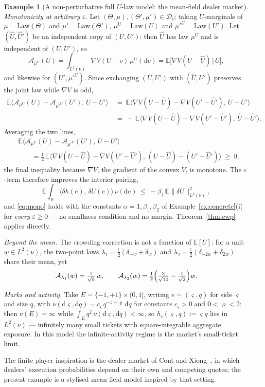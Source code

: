 \documentclass[preprint,12pt]{elsarticle}
\newcommand{\E}{\mathbb{E}}
\newcommand{\diff}{\mathrm{d}}
\newcommand{\inner}[2]{\langle #1,\,#2\rangle}
\newcommand{\Lnu}{L^2(\nu)}
\newcommand{\Law}{\mathrm{Law}}
\newcommand{\Lnorm}[1]{\lVert #1\rVert_{\Lnu}}
\numberwithin{equation}{section}
\theoremstyle{plain}
\theoremstyle{definition}
\theoremstyle{\PaperRemarkStyle}
\newtheorem{example}[theorem]{Example}
\begin{document}
\begin{example}[A non-perturbative full $U$-law model: the mean-field dealer market]
\smallskip
\emph{Monotonicity at arbitrary $\varepsilon$.} Let
$(\Theta,\mu),(\Theta',\mu')\in\mathcal D_t$; taking $U$-marginals of $\mu=\Law(\Theta)$
and $\mu'=\Law(\Theta')$, $\mu^U=\Law(U)$ and $\mu'^U=\Law(U')$. Let
$(\widehat U,\widehat U')$ be an independent copy of $(U,U')$: then $\widehat U$ has law
$\mu^U$ and is independent of $(U,U')$, so
\[
\mathcal A_{\mu^U}(U)=\int_{\Lnu}\nabla V(U-v)\,\mu^U(\diff v)
=\E\bigl[\nabla V(U-\widehat U)\,\big|\,U\bigr],
\]
and likewise for $(U',\mu'^U)$. Since
exchanging $(U,U')$ with $(\widehat U,\widehat U')$ preserves the joint law while
$\nabla V$ is odd,
\[
\begin{aligned}
\E\inner{\mathcal A_{\mu^U}(U)-\mathcal A_{\mu'^U}(U')}{U-U'}
&\ =\ \E\inner{\nabla V(U-\widehat U)-\nabla V(U'-\widehat U')}{U-U'}\\
&\ =\ -\,\E\inner{\nabla V(U-\widehat U)-\nabla V(U'-\widehat U')}{\widehat U-\widehat U'} .
\end{aligned}
\]
Averaging the two lines,
\[
\begin{aligned}
&\E\inner{\mathcal A_{\mu^U}(U)-\mathcal A_{\mu'^U}(U')}{U-U'}\\
&\qquad=\tfrac12\,\E\inner{\nabla V(U-\widehat U)-\nabla V(U'-\widehat U')}
{(U-\widehat U)-(U'-\widehat U')}\ \ge\ 0,
\end{aligned}
\]
the final inequality because $\nabla V$, the gradient of the convex $V$, is monotone.
The $\varepsilon$-term therefore improves the interior pairing,
\[
\E\int_E\inner{\delta h(e)}{\delta U(e)}\,\nu(\diff e)\ \le\ -\beta_1\,\E\Lnorm{\delta U}^2 ,
\]
and \eqref{eq:mono} holds with the constants $\alpha=1,\beta_1,\beta_2$ of
Example~\ref{ex:concrete}(i) for \emph{every} $\varepsilon\ge0$ --- no smallness
condition and no margin. Theorem~\ref{thm:cwp} applies directly.

\smallskip
\emph{Beyond the mean.} The crowding correction is not a function of $\E[U]$: for a
unit $w\in\Lnu$, the two-point laws $\lambda_1=\tfrac12(\delta_{-w}+\delta_{w})$ and
$\lambda_2=\tfrac12(\delta_{-2w}+\delta_{2w})$ share their mean, yet
\[
\mathcal A_{\lambda_1}(w)=\tfrac{1}{\sqrt5}\,w,\qquad
\mathcal A_{\lambda_2}(w)=\tfrac12\Bigl(\tfrac{3}{\sqrt{10}}-\tfrac1{\sqrt2}\Bigr)w .
\]

\smallskip
\emph{Marks and activity.} Take $E=\{-1,+1\}\times(0,1]$, writing $e=(\varsigma,q)$ for
side $\varsigma$ and size $q$, with
$\nu(\diff\varsigma,\diff q)=c_\varsigma\,q^{-1-\varrho}\,\diff q$ for constants
$c_\varsigma>0$ and $0<\varrho<2$: then $\nu(E)=\infty$ while
$\int_E q^2\,\nu(\diff\varsigma,\diff q)<\infty$, so $h_c(\varsigma,q):=\varsigma q$ lies
in $\Lnu$ --- infinitely many small tickets with square-integrable aggregate exposure. In
this model the infinite-activity regime is the market's small-ticket limit.

The finite-player inspiration is the dealer market of Cont and
Xiong~\cite{ContXiong}, in which dealers' execution probabilities depend on their own
and competing quotes; the present example is a stylised mean-field model inspired by that
setting.
\end{example}
\end{document}
